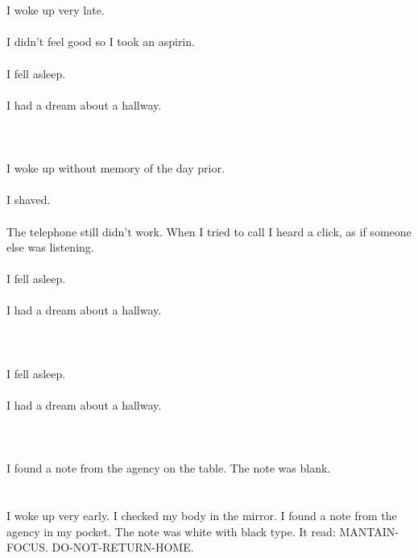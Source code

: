 \documentclass{article}
\begin{document}
    \section{}
    I woke up very late.\\\\I didn't feel good so I took an aspirin.\\\\I fell asleep.\\\\I had a dream about a hallway.\\\\ 
    \newpage
    
    \section{}
    I woke up without memory of the day prior.\\\\I shaved.\\\\The telephone still didn't work. When I tried to call I heard a click, as if someone else was listening.\\\\I fell asleep.\\\\I had a dream about a hallway.\\\\ 
    \newpage
    
    \section{}
    I fell asleep.\\\\I had a dream about a hallway.\\\\ 
    \newpage
    
    \section{}
    I found a note from the agency on the table. The note was blank.  
    \newpage
    
    \section{}
    I woke up very early. I checked my body in the mirror. I found a note from the agency in my pocket. The note was white with black type. It read: MANTAIN-FOCUS. DO-NOT-RETURN-HOME.  
    \newpage
    
\end{document}
